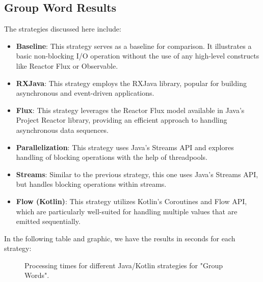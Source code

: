     \clearpage

    \subsection{Group Word Results}
    \label{subsubsec:group_word_results}
    
   The strategies discussed here include:

    \begin{itemize}
        \item \textbf{Baseline}: This strategy serves as a baseline for comparison. It illustrates a basic non-blocking I/O operation without the use of any high-level constructs like Reactor Flux or Observable.
        \item \textbf{RXJava}: This strategy employs the RXJava library, popular for building asynchronous and event-driven applications.
        \item \textbf{Flux}: This strategy leverages the Reactor Flux model available in Java's Project Reactor library, providing an efficient approach to handling asynchronous data sequences.
        \item \textbf{Parallelization}: This strategy uses Java's Streams API and explores handling of blocking operations with the help of threadpools.
        \item \textbf{Streams}: Similar to the previous strategy, this one uses Java's Streams API, but handles blocking operations within streams.
        \item \textbf{Flow (Kotlin)}: This strategy utilizes Kotlin's Coroutines and Flow API, which are particularly well-suited for handling multiple values that are emitted sequentially.
    \end{itemize}

    In the following table and graphic, we have the results in seconds for each strategy:

    \begin{figure}[H]
        \centering
        \caption{Processing times for different Java/Kotlin strategies for "Group Words".}
        \label{fig:processing_times}
    \end{figure}
    

